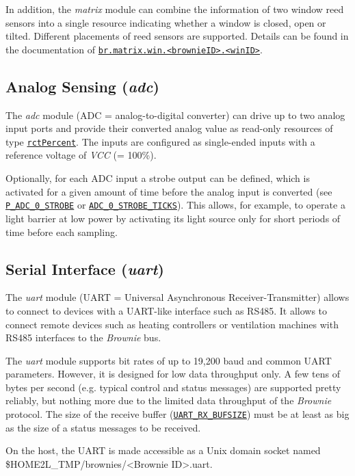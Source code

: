 \documentclass[12pt,english,parskip=half,headheight=19pt]{scrreprt}
\newcommand{\lstf}[1]{\colorbox{lstbackground}{\ttfamily\footnotesize#1}}
\newcommand{\idx}[1]{#1\index{#1}}
\newcommand{\refenv}[1]{\hyperref[env:#1]{\texttt{#1}}}        %
\newcommand{\refapic}[1]{\href{home2l-api_c/index.html}{\mbox{\texttt{#1}}}}            %
\begin{document}
In addition, the \textit{matrix} module can combine the information of two window reed sensors into a single resource indicating whether a window is closed, open or tilted. Different placements of reed sensors are supported. Details can be found in the documentation of \refenv{br.matrix.win.<brownieID>.<winID>}.



\subsection{Analog Sensing (\textit{adc})}
\label{sec:brownies-features-adc}

The \textit{adc} module (ADC = analog-to-digital converter) can drive up to two analog input ports and provide their converted analog value as read-only resources of type \refapic{rctPercent}. The inputs are configured as single-ended inputs with a reference voltage of \textit{VCC} (= 100\%).

Optionally, for each ADC input a strobe output can be defined, which is activated for a given amount of time before the analog input is converted (see \refapic{P\_ADC\_0\_STROBE} or \refapic{ADC\_0\_STROBE\_TICKS}). This allows, for example, to operate a light barrier at low power by activating its light source only for short periods of time before each sampling.



\subsection{Serial Interface (\textit{uart})}

The \textit{uart} module (UART = Universal Asynchronous Receiver-Transmitter) allows to connect to devices with a UART-like interface such as RS485. It allows to connect remote devices such as heating controllers or ventilation machines with RS485 interfaces to the \textit{Brownie} bus.

The \textit{uart} module supports bit rates of up to 19,200 baud and common UART parameters. However, it is designed for low data throughput only. A few tens of bytes per second (e.g. typical control and status messages) are supported pretty reliably, but nothing more due to the limited data throughput of the \textit{Brownie} protocol. The size of the receive buffer (\refapic{UART\_RX\_BUFSIZE}) must be at least as big as the size of a status messages to be received.

On the host, the UART is made accessible as a Unix domain socket named \lstf{\$HOME2L\_TMP/brownies/<Brownie ID>.uart}.
\end{document}

